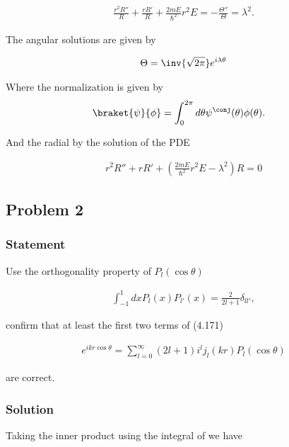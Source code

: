 \begin{align}\label{eqn:desaiCh4:152}
\frac{r^2 R''}{R} + \frac{r R'}{R} + \frac{2 m E}{\hbar^2} r^2 E = -\frac{\Theta''}{\Theta} = \lambda^2.
\end{align}

The angular solutions are given by 

\begin{align}\label{eqn:desaiCh4:153}
\Theta = \inv{\sqrt{2\pi}} e^{i \lambda \theta}
\end{align}

Where the normalization is given by 
\begin{align}\label{eqn:desaiCh4:160}
\braket{\psi}{\phi} &= 
\int_{0}^{2 \pi} d\theta \psi^\conj(\theta) \phi(\theta).
\end{align}

And the radial by the solution of the PDE

\begin{align}\label{eqn:desaiCh4:154}
r^2 R'' + r R' + \left( \frac{2 m E}{\hbar^2} r^2 E - \lambda^2 \right) R = 0
\end{align}

\subsection{Problem 2}
\subsubsection{Statement}

Use the orthogonality property of $P_l(\cos\theta)$

\begin{align}\label{eqn:desaiCh4:200}
\int_{-1}^1 dx P_l(x) P_{l'}(x) = \frac{2}{2l+1} \delta_{l l'},
\end{align}

confirm that at least the first two terms of (4.171)

\begin{align}\label{eqn:desaiCh4:201}
e^{i k r \cos\theta} = \sum_{l=0}^\infty (2l + 1) i^l j_l(kr) P_l(\cos\theta)
\end{align}

are correct.

\subsubsection{Solution}

Taking the inner product using the integral of  we have

